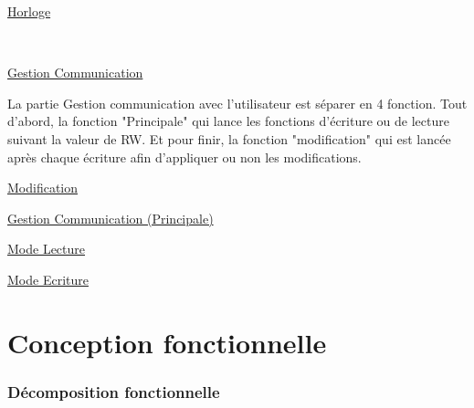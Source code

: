 \documentclass[11pt, french]{article} %
\begin{document}
\vspace{0.2in}
\underline{Horloge}

\begin{minipage}[t, h]{8cm}

\end{minipage}
~
\begin{minipage}[t, h]{8cm}

\end{minipage}


\underline{Gestion Communication}
\vspace{0.2in}

La partie Gestion communication avec l'utilisateur est séparer en 4 fonction. Tout d'abord, la fonction "Principale" qui lance les fonctions d'écriture ou de lecture suivant la valeur de RW. Et pour finir, la fonction "modification" qui est lancée après chaque écriture afin d'appliquer ou non les modifications.

\vspace{0.2in}
\hspace{0.2in}
\underline{Modification}

\begin{center}

\end{center}

\vspace{0.2in}
\hspace{0.2in}
\underline{Gestion Communication (Principale)}

\begin{center}

\end{center}

\pagebreak
\begin{landscape}

\hspace{0.2in}
\underline{Mode Lecture}

\begin{center}

\end{center}

\hspace{0.2in}
\vspace{0.2in}
\underline{Mode Ecriture}

\begin{center}

\end{center}
\end{landscape}

\part{Conception fonctionnelle}
\section{Décomposition fonctionnelle}

\begin{center}
{

}
\end{center}
\end{document}
